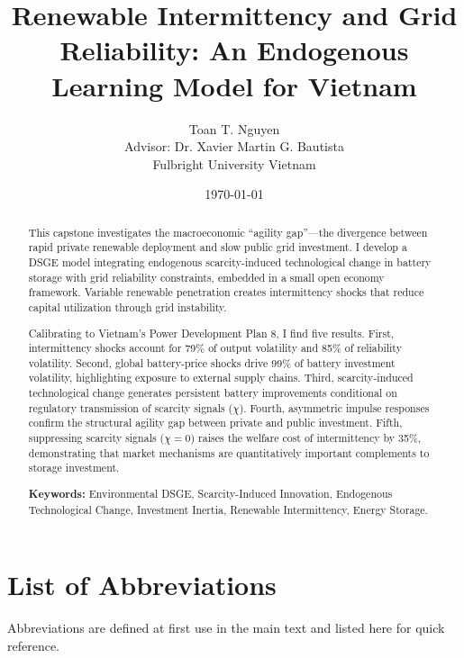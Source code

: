 \documentclass[12pt, a4paper]{article}
\title{Renewable Intermittency and Grid Reliability: An Endogenous Learning Model for Vietnam}
\author{Toan T. Nguyen \\ \small{Advisor: Dr. Xavier Martin G. Bautista} \\ \small{Fulbright University Vietnam}}
\date{\today}
\begin{document}
\maketitle

\tableofcontents
\clearpage

\begin{abstract}
This capstone investigates the macroeconomic ``agility gap''---the divergence between rapid private renewable deployment and slow public grid investment. I develop a DSGE model integrating endogenous scarcity-induced technological change in battery storage with grid reliability constraints, embedded in a small open economy framework. Variable renewable penetration creates intermittency shocks that reduce capital utilization through grid instability.

Calibrating to Vietnam's Power Development Plan 8, I find five results. First, intermittency shocks account for 79\% of output volatility and 85\% of reliability volatility. Second, global battery-price shocks drive 99\% of battery investment volatility, highlighting exposure to external supply chains. Third, scarcity-induced technological change generates persistent battery improvements conditional on regulatory transmission of scarcity signals ($\chi$). Fourth, asymmetric impulse responses confirm the structural agility gap between private and public investment. Fifth, suppressing scarcity signals ($\chi = 0$) raises the welfare cost of intermittency by 35\%, demonstrating that market mechanisms are quantitatively important complements to storage investment.

\vspace{0.5cm}
\noindent \textbf{Keywords:} Environmental DSGE, Scarcity-Induced Innovation, Endogenous Technological Change, Investment Inertia, Renewable Intermittency, Energy Storage.
\end{abstract}
\clearpage

\section*{List of Abbreviations}
\noindent Abbreviations are defined at first use in the main text and listed here for quick reference.
\end{document}
